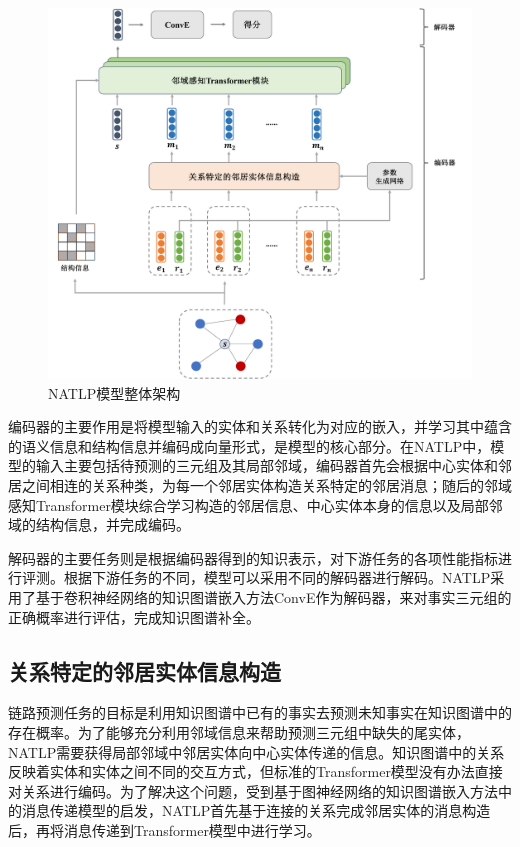 \begin{figure}[htb]
  \centerline{\includegraphics[width=1\textwidth]{pic/architecture.pdf}}
  \caption{NATLP模型整体架构}
  \label{architecture}
\end{figure}

编码器的主要作用是将模型输入的实体和关系转化为对应的嵌入，并学习其中蕴含的语义信息和结构信息并编码成向量形式，是模型的核心部分。在NATLP中，模型的输入主要包括待预测的三元组及其局部邻域，编码器首先会根据中心实体和邻居之间相连的关系种类，为每一个邻居实体构造关系特定的邻居消息；随后的邻域感知Transformer模块综合学习构造的邻居信息、中心实体本身的信息以及局部邻域的结构信息，并完成编码。

解码器的主要任务则是根据编码器得到的知识表示，对下游任务的各项性能指标进行评测。根据下游任务的不同，模型可以采用不同的解码器进行解码。NATLP采用了基于卷积神经网络的知识图谱嵌入方法ConvE作为解码器，来对事实三元组的正确概率进行评估，完成知识图谱补全。

\subsection{关系特定的邻居实体信息构造}

链路预测任务的目标是利用知识图谱中已有的事实去预测未知事实在知识图谱中的存在概率。为了能够充分利用邻域信息来帮助预测三元组中缺失的尾实体，NATLP需要获得局部邻域中邻居实体向中心实体传递的信息。知识图谱中的关系反映着实体和实体之间不同的交互方式，但标准的Transformer模型没有办法直接对关系进行编码。为了解决这个问题，受到基于图神经网络的知识图谱嵌入方法中的消息传递模型的启发，NATLP首先基于连接的关系完成邻居实体的消息构造后，再将消息传递到Transformer模型中进行学习。

